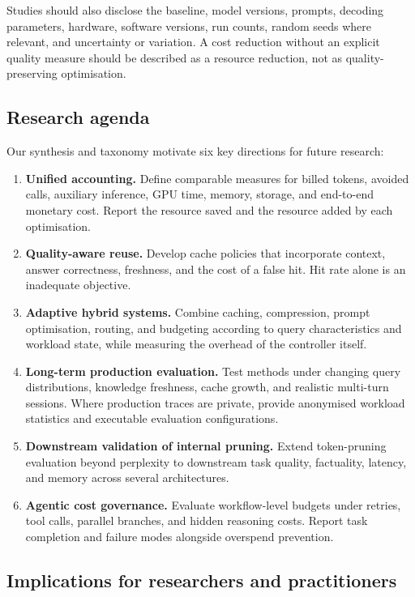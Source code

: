 \IfFileExists{jair.cls}{\documentclass{jair}}{\documentclass[manuscript,nonacm,screen]{acmart}}
\begin{document}
Studies should also disclose the baseline, model versions, prompts, decoding parameters, hardware, software versions, run counts, random seeds where relevant, and uncertainty or variation. A cost reduction without an explicit quality measure should be described as a resource reduction, not as quality-preserving optimisation.

\subsection{Research agenda}

Our synthesis and taxonomy motivate six key directions for future research:

\begin{enumerate}[leftmargin=1.5em]
\item \textbf{Unified accounting.} Define comparable measures for billed tokens, avoided calls, auxiliary inference, GPU time, memory, storage, and end-to-end monetary cost. Report the resource saved and the resource added by each optimisation.
\item \textbf{Quality-aware reuse.} Develop cache policies that incorporate context, answer correctness, freshness, and the cost of a false hit. Hit rate alone is an inadequate objective.
\item \textbf{Adaptive hybrid systems.} Combine caching, compression, prompt optimisation, routing, and budgeting according to query characteristics and workload state, while measuring the overhead of the controller itself.
\item \textbf{Long-term production evaluation.} Test methods under changing query distributions, knowledge freshness, cache growth, and realistic multi-turn sessions. Where production traces are private, provide anonymised workload statistics and executable evaluation configurations.
\item \textbf{Downstream validation of internal pruning.} Extend token-pruning evaluation beyond perplexity to downstream task quality, factuality, latency, and memory across several architectures.
\item \textbf{Agentic cost governance.} Evaluate workflow-level budgets under retries, tool calls, parallel branches, and hidden reasoning costs. Report task completion and failure modes alongside overspend prevention.
\end{enumerate}

\subsection{Implications for researchers and practitioners}
\end{document}
